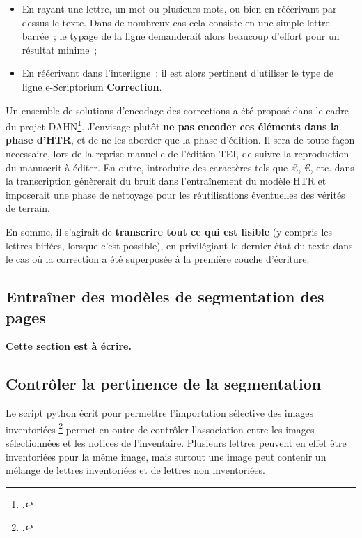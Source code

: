 \documentclass[a4paper,12pt,twoside]{book}
\begin{document}
				\begin{itemize}
					\item En rayant une lettre, un mot ou plusieurs mots, ou bien en réécrivant par dessus le texte. Dans de nombreux cas cela consiste en une simple lettre barrée~; le typage de la ligne demanderait alors beaucoup d'effort pour un résultat minime~;
					\item En réécrivant dans l'interligne~: il est alors pertinent d'utiliser le type de ligne e-Scriptorium \textbf{Correction}.
				\end{itemize}
				
				Un ensemble de solutions d'encodage des corrections a été proposé dans le cadre du projet DAHN\footcite{chiffoleauFewTipsReading}. J'envisage plutôt \textbf{ne pas encoder ces éléments dans la phase d'HTR}, et de ne les aborder que la phase d'édition. Il sera de toute façon necessaire, lors de la reprise manuelle de l'édition TEI, de suivre la reproduction du manuscrit à éditer. En outre, introduire des caractères tels que £, €, etc. dans la transcription génèrerait du bruit dans l'entraînement du modèle HTR et imposerait une phase de nettoyage pour les réutilisations éventuelles des vérités de terrain.
				
				En somme, il s'agirait de \textbf{transcrire tout ce qui est lisible} (y compris les lettres biffées, lorsque c'est possible), en privilégiant le dernier état du texte dans le cas où la correction a été superposée à la première couche d'écriture.
		
			\subsection{Entraîner des modèles de segmentation des pages}
	    		\textbf{Cette section est à écrire.}
	    		
	    	\subsection{Contrôler la pertinence de la segmentation}
		    	\label{controle-segmentation-lettres-inventoriees}
	    		Le script python écrit pour permettre l'importation sélective des images inventoriées \footcite{biayDonneesImagesPy2022} permet en outre de contrôler l'association entre les images sélectionnées et les notices de l'inventaire. Plusieurs lettres peuvent en effet être inventoriées pour la même image, mais surtout une image peut contenir un mélange de lettres inventoriées et de lettres non inventoriées.
	    		
\end{document}
